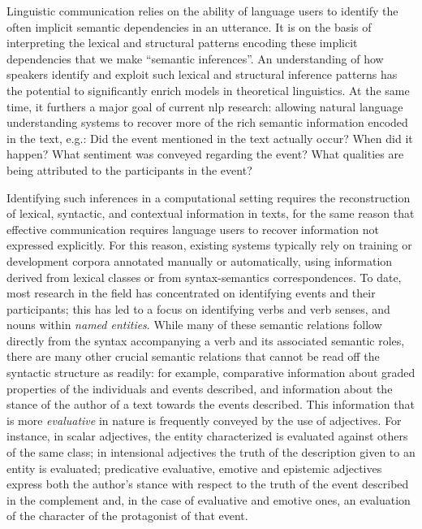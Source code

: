 \documentclass[10pt]{article}
\begin{document}
Linguistic communication relies on the ability of language users to identify the often implicit semantic dependencies in an utterance. It is on the basis of 
interpreting the lexical and structural  patterns encoding these implicit dependencies that we make ``semantic inferences''. An understanding of how speakers identify and exploit such lexical and structural inference patterns has the potential to significantly enrich models in theoretical linguistics. 
At the same time, it furthers a major goal of current {\sc nlp} research: allowing natural language understanding systems to recover more of the rich semantic information encoded in the text, e.g.: Did the event mentioned in the text actually occur? When did it happen? What sentiment was conveyed regarding the event? What qualities are being attributed to the participants in the event? 

Identifying such inferences in a computational setting requires the reconstruction of lexical, syntactic, and contextual information in texts, for the same reason that effective communication requires language users to recover information not expressed explicitly. For this reason, existing systems typically rely on training or development corpora annotated manually or automatically, using information derived from lexical classes or from syntax-semantics correspondences.
To date, most research in the field has concentrated on identifying events and their participants; this has led to a focus on identifying verbs and verb senses, and nouns within {\it named entities}. While many of these semantic relations follow directly from the syntax accompanying a verb and its associated semantic roles, there are many other crucial semantic relations that cannot be read off the syntactic structure as readily: for example, comparative information about graded properties of the  individuals and events described, and information about the stance of the author of a text towards the events described. This information that is more \emph{evaluative} in nature is frequently conveyed by the use of adjectives. For instance, in scalar adjectives, the entity characterized is evaluated against others of the same class; in intensional adjectives the truth of the description given to an entity is evaluated; predicative evaluative, emotive and epistemic adjectives express both the author's stance with respect to the truth of the event described in the complement and, in the case of evaluative and emotive ones, an evaluation of the character of the protagonist of that event. 
\end{document}
